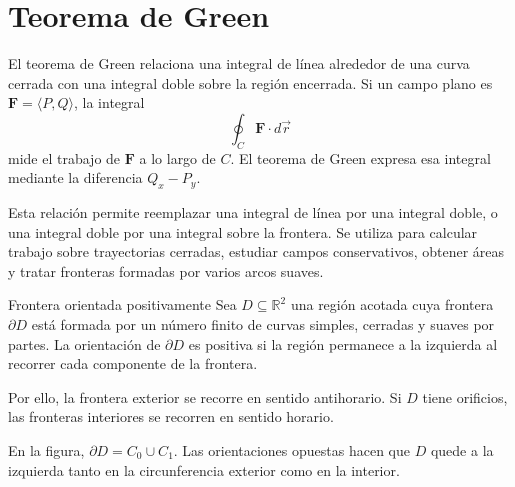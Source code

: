 \section{Teorema de Green}

El teorema de Green relaciona una integral de línea alrededor de una curva cerrada con una integral doble sobre la región encerrada. Si un campo plano es $\mathbf{F}=\langle P,Q\rangle$, la integral
\[
\oint_C \mathbf{F}\cdot d\vec r
\]
mide el trabajo de $\mathbf{F}$ a lo largo de $C$. El teorema de Green expresa esa integral mediante la diferencia $Q_x-P_y$.

Esta relación permite reemplazar una integral de línea por una integral doble, o una integral doble por una integral sobre la frontera. Se utiliza para calcular trabajo sobre trayectorias cerradas, estudiar campos conservativos, obtener áreas y tratar fronteras formadas por varios arcos suaves.

\begin{mydefinition}{Frontera orientada positivamente}
Sea $D\subseteq\mathbb R^2$ una región acotada cuya frontera $\partial D$ está formada por un número finito de curvas simples, cerradas y suaves por partes. La orientación de $\partial D$ es positiva si la región permanece a la izquierda al recorrer cada componente de la frontera.

Por ello, la frontera exterior se recorre en sentido antihorario. Si $D$ tiene orificios, las fronteras interiores se recorren en sentido horario.
\end{mydefinition}

\begingroup
\shorthandoff{>}
\begin{center}
\end{center}
\endgroup

En la figura, $\partial D=C_0\cup C_1$. Las orientaciones opuestas hacen que $D$ quede a la izquierda tanto en la circunferencia exterior como en la interior.

